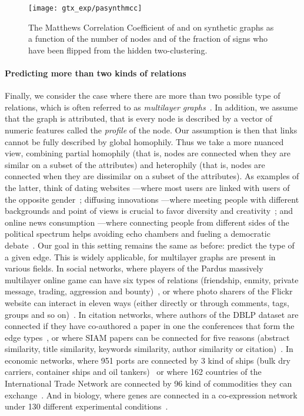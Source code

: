 \begin{figure}[phtb]
  \centering
  \texttt{[image: gtx\_exp/pasynthmcc]}
  \caption{The Matthews Correlation Coefficient of \bfs{} and \gtx{} on synthetic \lpa{} graphs as a
    function of the number of nodes and of the fraction of signs who have been flipped from the
    hidden two-clustering.  \label{fig:gtx_xp_pasynthmcc}}
\end{figure}

\vspace{-\baselineskip}
\paragraph{Predicting more than two kinds of relations}

Finally, we consider the case where there are more than two possible type of relations, which is
often referred to as \emph{multilayer graphs}~\autocites{Kivela2014}{multiSurvey14}. In addition, we assume
that the graph is attributed, that is every node is described by a vector of numeric features called
the \emph{profile} of the node. Our assumption is then that links cannot be fully described by
global homophily. Thus we take a more nuanced view, combining partial homophily (that is, nodes are
connected when they are similar on a subset of the attributes) and heterophily (that is, nodes are
connected when they are dissimilar on a subset of the attributes). As examples of the latter, think
of dating websites ---where most users are linked with users of the opposite
gender~\autocites{homophilyMyspace09}{Tinder16}; diffusing innovations ---where meeting people with
different backgrounds and point of views is crucial to favor diversity and
creativity~\autocite{rogers2003diffusion}; and online news consumption ---where connecting people
from different sides of the political spectrum helps avoiding echo chambers and fueling a democratic
debate~\autocite{balancedNews17}. Our goal in this setting remains the same as before: predict the
type of a given edge. This is
widely applicable, for multilayer graphs are present  in various fields. In social networks, where
players of the Pardus massively multilayer online game can have six types of relations (friendship,
enmity, private message, trading, aggression and bounty)~\autocite{Szell2010}, or where photo sharers
of the Flickr website can interact in eleven ways (either directly or through comments, tags, groups
and so on)~\autocite{RecoFlickrMulti11}. In citation networks, where authors of the DBLP dataset are
connected if they have co-authored a paper in one the  conferences that form the edge
types~\autocite{communityDBLPbyConf05}, or where  SIAM papers can be connected for five
reasons (abstract similarity, title similarity, keywords similarity, author similarity or
citation)~\autocite{articlesMultiSim11}. In economic networks, where 951 ports are connected by 3
kind of ships (bulk dry carriers, container ships and oil tankers)~\autocite{ports3kindofships10} or
where 162 countries of the International Trade Network are connected by 96 kind of commodities they
can exchange~\autocite{worldTradeNetwork10}. And in biology, where genes are connected in a
co-expression network under 130 different experimental conditions~\autocite{bioLayerExp11}.

